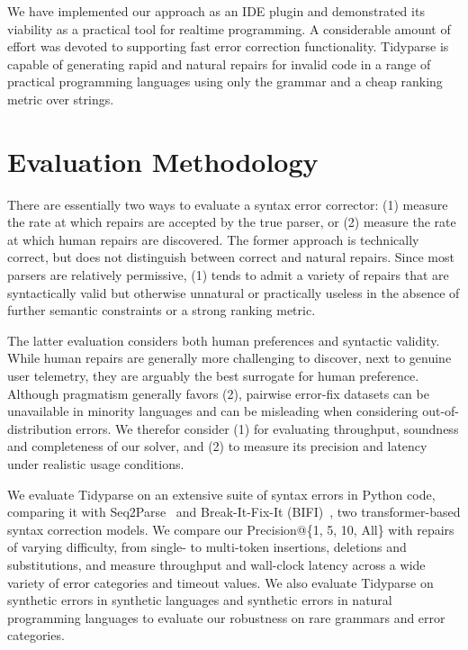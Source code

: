 \documentclass[sigplan,screen]{acmart}
\begin{document}
We have implemented our approach as an IDE plugin and demonstrated its viability as a practical tool for realtime programming. A considerable amount of effort was devoted to supporting fast error correction functionality. Tidyparse is capable of generating rapid and natural repairs for invalid code in a range of practical programming languages using only the grammar and a cheap ranking metric over strings.


\section{Evaluation Methodology}


There are essentially two ways to evaluate a syntax error corrector: (1) measure the rate at which repairs are accepted by the true parser, or (2) measure the rate at which human repairs are discovered. The former approach is technically correct, but does not distinguish between correct and natural repairs. Since most parsers are relatively permissive, (1) tends to admit a variety of repairs that are syntactically valid but otherwise unnatural or practically useless in the absence of further semantic constraints or a strong ranking metric.

The latter evaluation considers both human preferences and syntactic validity. While human repairs are generally more challenging to discover, next to genuine user telemetry, they are arguably the best surrogate for human preference. Although pragmatism generally favors (2), pairwise error-fix datasets can be unavailable in minority languages and can be misleading when considering out-of-distribution errors. We therefor consider (1) for evaluating throughput, soundness and completeness of our solver, and (2) to measure its precision and latency under realistic usage conditions.

We evaluate Tidyparse on an extensive suite of syntax errors in Python code, comparing it with Seq2Parse~\cite{sakkas2022seq2parse} and Break-It-Fix-It (BIFI)~\cite{yasunaga2021break}, two transformer-based syntax correction models. We compare our Precision@\{1, 5, 10, All\} with repairs of varying difficulty, from single- to multi-token insertions, deletions and substitutions, and measure throughput and wall-clock latency across a wide variety of error categories and timeout values. We also evaluate Tidyparse on synthetic errors in synthetic languages and synthetic errors in natural programming languages to evaluate our robustness on rare grammars and error categories.
\end{document}
